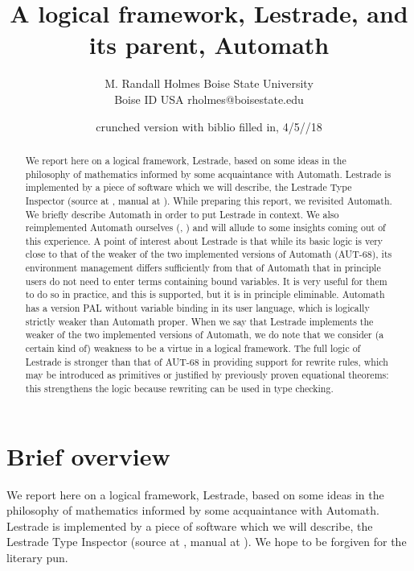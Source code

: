 \documentclass[submission,copyright,creativecommons]{eptcs}
\title{A logical framework, Lestrade, and its parent, Automath}
\author{M. Randall Holmes 
\institute  \quad Boise State University\\Boise ID USA 
\email \quad rholmes@boisestate.edu}
\date{crunched version with biblio filled in, 4/5//18}
\begin{document}
\maketitle

\begin{abstract}
We report here on a logical framework, Lestrade, based on some ideas in the philosophy of mathematics informed by some acquaintance with Automath.  Lestrade is implemented by a piece of software which we will describe, the Lestrade Type Inspector (source at \cite{lestradesource}, manual at \cite{lestrademanual}).   While preparing this report, we revisited Automath.  We briefly describe Automath in order to put Lestrade in context.  We also reimplemented Automath ourselves (\cite{maniacsource}, \cite{maniacmanual}) and will allude to some insights coming out of this experience.  A point of interest about Lestrade is that while its basic logic is very close to that of the weaker of the two implemented versions of Automath (AUT-68), its environment management differs sufficiently from that of Automath that in principle users do not need to enter terms containing bound variables.  It is very useful for them to do so in practice, and this is supported, but it is in principle eliminable.  Automath has a version PAL without variable binding in its user language, which is logically strictly weaker than Automath proper.  When we say that Lestrade implements the weaker of the two implemented versions of Automath, we do note that we consider (a certain kind of) weakness to be a virtue in a logical framework.  The full logic of Lestrade is stronger than that of AUT-68 in providing support for rewrite rules, which may be introduced as primitives or justified by previously proven equational theorems:  this strengthens the logic because rewriting can be used in type checking.

\end{abstract}

\section{Brief overview}

We report here on a logical framework, Lestrade, based on some ideas in the philosophy of mathematics informed by some acquaintance with Automath.  Lestrade is implemented by a piece of software which we will describe, the Lestrade Type Inspector (source at \cite{lestradesource}, manual at \cite{lestrademanual}).  We hope to be forgiven for the literary pun.
\end{document}
